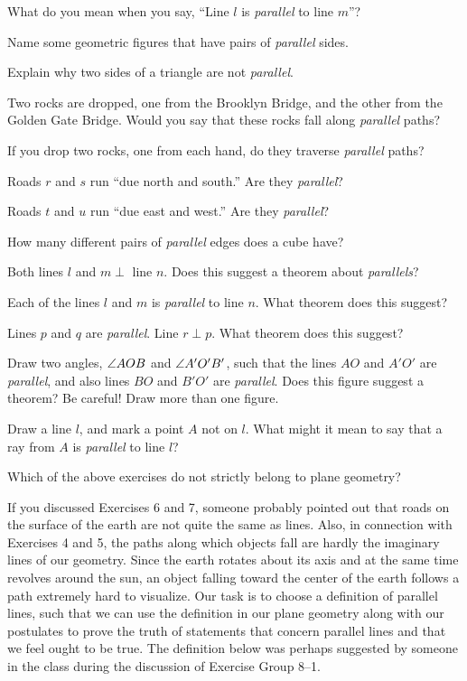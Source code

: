 \documentclass[11pt]{book}
\begin{document}
\begin{exercisecols}
\begin{exlist}
\item What do you mean when you say, ``Line $l$ is \emph{parallel} to line
  $m$''?
\item Name some geometric figures that have pairs of \emph{parallel} sides.
\item Explain why two sides of a triangle are not \emph{parallel}.
\item Two rocks are dropped, one from the Brooklyn Bridge, and the other from
  the Golden Gate Bridge. Would you say that these rocks fall along
  \emph{parallel} paths?
\item If you drop two rocks, one from each hand, do they traverse
  \emph{parallel} paths?
\item Roads $r$ and $s$ run ``due north and south.'' Are they \emph{parallel}?
\item Roads $t$ and $u$ run ``due east and west.'' Are they \emph{parallel}?
\item How many different pairs of \emph{parallel} edges does a cube have?
\item Both lines $l$ and $m \perp$ line $n$. Does this suggest a theorem about
  \emph{parallels}?
\item Each of the lines $l$ and $m$ is \emph{parallel} to line $n$. What
  theorem does this suggest?
\item Lines $p$ and $q$ are \emph{parallel}. Line $r \perp p$. What theorem
  does this suggest?
\item Draw two angles, $\angle AOB$ and $\angle A'O'B'$, such that the lines
  $AO$ and $A'O'$ are \emph{parallel}, and also lines $BO$ and $B'O'$ are
  \emph{parallel}. Does this figure suggest a theorem? Be careful! Draw more
  than one figure.
\item Draw a line $l$, and mark a point $A$ not on $l$. What might it mean to
  say that a ray from $A$ is \emph{parallel} to line $l$?
\item Which of the above exercises do not strictly belong to plane geometry?
\end{exlist}
\end{exercisecols}

If you discussed Exercises 6 and 7, someone probably pointed out that roads on
the surface of the earth are not quite the same as lines. Also, in connection
with Exercises 4 and 5, the paths along which objects fall are hardly the
imaginary lines of our geometry. Since the earth rotates about its axis and at
the same time revolves around the sun, an object falling toward the center of
the earth follows a path extremely hard to visualize. Our task is to choose a
definition of parallel lines, such that we can use the definition in our plane
geometry along with our postulates to prove the truth of statements that
concern parallel lines and that we feel ought to be true. The definition below
was perhaps suggested by someone in the class during the discussion of
Exercise Group 8--1.
\end{document}
